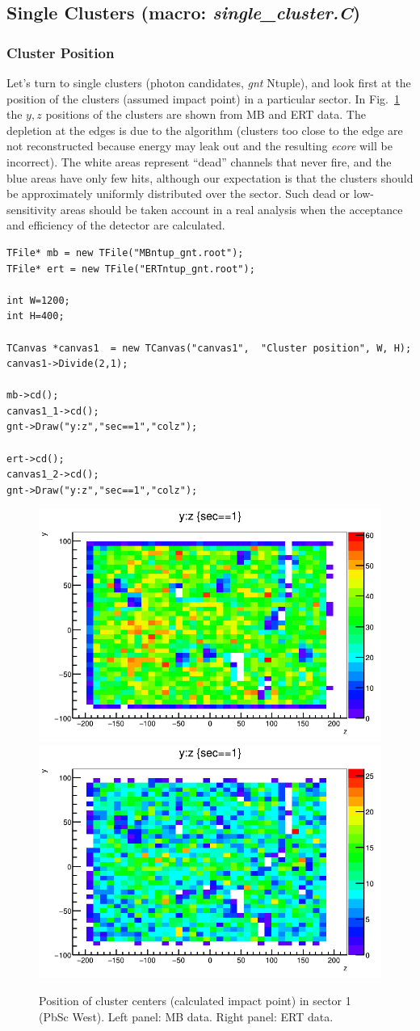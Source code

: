 \documentclass[pdftex,12pt,letter]{article}
\begin{document}
\subsection{Single Clusters (macro: \textit{single\_cluster.C})}
\subsubsection{Cluster Position}
Let's turn to single clusters (photon candidates, {\it gnt} Ntuple),
and look first at the position of the clusters (assumed impact point)
in a particular sector.  In Fig.~\ref{fig:deadhot} the $y,z$ positions
of the clusters are shown from MB and ERT data.  The depletion at the
edges is due to the algorithm (clusters too close to the edge are not
reconstructed because energy may leak out and the resulting 
{\it  ecore} will be incorrect).  The white areas represent ``dead''
channels that never fire, and the blue areas have only few hits,
although our expectation is that the clusters should be approximately
uniformly distributed over the sector.  Such dead or low-sensitivity
areas should be taken account in a real analysis when the acceptance
and efficiency of the detector are calculated.

\begin{lstlisting}
TFile* mb = new TFile("MBntup_gnt.root");
TFile* ert = new TFile("ERTntup_gnt.root");

int W=1200;
int H=400;

TCanvas *canvas1  = new TCanvas("canvas1",  "Cluster position", W, H);
canvas1->Divide(2,1);

mb->cd();
canvas1_1->cd();
gnt->Draw("y:z","sec==1","colz");

ert->cd();
canvas1_2->cd();
gnt->Draw("y:z","sec==1","colz");
\end{lstlisting}


\begin{center}
\begin{figure}[htbp]
  \includegraphics[width=0.4\linewidth]{figs/mbsec1_yz.png}
  \includegraphics[width=0.4\linewidth]{figs/ertsec1_yz.png}
  \caption{Position of cluster centers (calculated impact point) in
    sector 1 (PbSc West).  Left panel: MB data.  Right panel: ERT data.
  }
    \label{fig:deadhot}
\end{figure}
\end{center}
\end{document}
